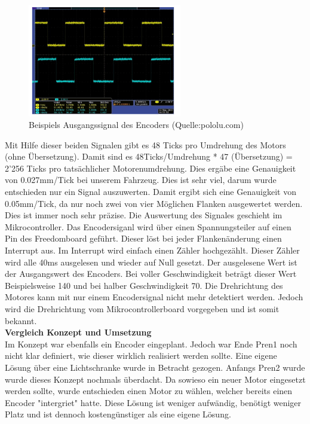 \begin{figure}[H]%
\centering
\includegraphics[width=0.6\textwidth]{03_Loesungskonzept/pictures/Encoder_Out.png}
\caption{Beispiels Ausgangssignal des Encoders (Quelle:pololu.com)}
\label{fig:encoder_out}
\end{figure}
Mit Hilfe dieser beiden Signalen gibt es 48 Ticks pro Umdrehung des Motors (ohne Übersetzung). Damit sind es 48Ticks/Umdrehung * 47 (Übersetzung) = 2'256 Ticks pro tatsächlicher Motorenumdrehung. Dies ergäbe eine Genauigkeit von 0.027mm/Tick bei unserem Fahrzeug. Dies ist sehr viel, darum wurde entschieden nur ein Signal auszuwerten. Damit ergibt sich eine Genauigkeit von 0.05mm/Tick, da nur noch zwei von vier Möglichen Flanken ausgewertet werden. Dies ist immer noch sehr präzise. Die Auswertung des Signales geschieht im Mikrocontroller. Das Encodersiganl wird über einen Spannungsteiler auf einen Pin des Freedomboard geführt. Dieser löst bei jeder Flankenänderung einen Interrupt aus. Im Interrupt wird einfach einen Zähler hochgezählt. Dieser Zähler wird alle 40ms ausgelesen und wieder auf Null gesetzt. Der ausgelesene Wert ist der Ausgangswert des Encoders. Bei voller Geschwindigkeit beträgt dieser Wert Beispielsweise 140 und bei halber Geschwindigkeit 70. Die Drehrichtung des Motores kann mit nur einem Encodersignal nicht mehr detektiert werden. Jedoch wird die Drehrichtung vom Mikrocontrollerboard vorgegeben und ist somit bekannt.\\[0.2cm]
\textbf{Vergleich Konzept und Umsetzung}\\[0.2cm]
Im Konzept war ebenfalls ein Encoder eingeplant. Jedoch war Ende Pren1 noch nicht klar definiert, wie dieser wirklich realisiert werden sollte. Eine eigene Lösung über eine Lichtschranke wurde in Betracht gezogen. Anfangs Pren2 wurde wurde dieses Konzept nochmals überdacht. Da sowieso ein neuer Motor eingesetzt werden sollte, wurde entschieden einen Motor zu wählen, welcher bereits einen Encoder "intergriet" hatte. Diese Lösung ist weniger aufwändig, benötigt weniger Platz und ist dennoch kostengünstiger als eine eigene Lösung.\\[0.2cm]
